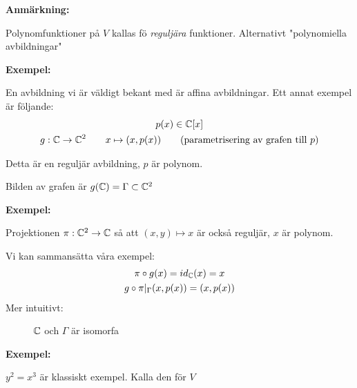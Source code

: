 \par\bigskip
\noindent\textbf{Anmärkning:}\par
\noindent Polynomfunktioner på $V$ kallas fö \textit{reguljära} funktioner. Alternativt "polynomiella avbildningar"
\par\bigskip
\noindent\textbf{Exempel:}\par
\noindent En avbildning vi är väldigt bekant med är affina avbildningar. Ett annat exempel är följande:
\begin{equation*}
  \begin{gathered}
    p(x)\in\mathbb{C}[x]\\
    g:\mathbb{C}\to\mathbb{C}^2\qquad x\mapsto(x,p(x))\qquad\text{(parametrisering av grafen till $p$)}
  \end{gathered}
\end{equation*}\par
\noindent Detta är en reguljär avbildning, $p$ är polynom.\par
\noindent Bilden av grafen är $g(\mathbb{C}) = \Gamma\subset\mathbb{C}^2$
\par\bigskip
\noindent\textbf{Exempel:}\par
\noindent Projektionen $\pi:\mathbb{C}^2\to\mathbb{C}$ så att $(x,y)\mapsto x$ är också reguljär, $x$ är polynom.
\par\bigskip
\noindent Vi kan sammansätta våra exempel:
\begin{equation*}
  \begin{gathered}
    \pi\circ g(x) = id_{\mathbb{C}}(x) = x\\
    g\circ \pi|_\Gamma(x,p(x)) = (x,p(x))
  \end{gathered}
\end{equation*}
\newpage
\noindent Mer intuitivt:
\begin{figure}[ht!]
    \centering
    \caption{$\mathbb{C}$ och $\Gamma$ är isomorfa}
\end{figure}
\par\bigskip
\par\bigskip
\noindent\textbf{Exempel:}\par
\noindent $y^2=x^3$ är klassiskt exempel. Kalla den för $V$\par
